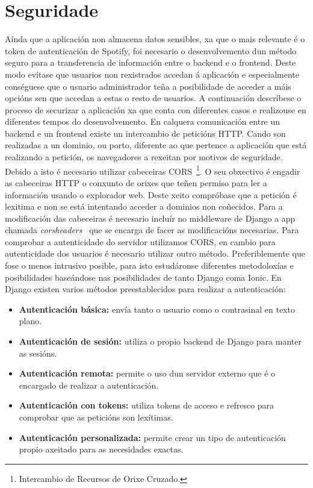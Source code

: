 \section{Seguridade}
Aínda que a aplicación non almacena datos sensibles, xa que o mais relevante é o token de autenticación de Spotify, foi necesario o desenvolvemento dun método seguro para a transferencia de información entre o backend e o frontend. Deste modo evítase que usuarios non rexistrados accedan á aplicación e especialmente conséguese que o usuario administrador teña a posibilidade de acceder a máis opcións sen que accedan a estas o resto de usuarios. A continuación descríbese o proceso de securizar a aplicación xa que conta con diferentes casos e realizouse en diferentes tempos do desenvolvemento.\smallbreak 
En calquera comunicación entre un backend e un frontend existe un intercambio de peticións \acrshort{HTTP}. Cando son realizadas a un dominio, ou porto, diferente ao que pertence a aplicación que está realizando a petición, os navegadores a rexeitan por motivos de seguridade. Debido a isto é necesario utilizar cabeceiras \acrlong{CORS}~\footnote{Intercambio de Recursos de Orixe Cruzado.}. O seu obxectivo é engadir as cabeceiras HTTP o conxunto de orixes que teñen permiso para ler a información usando o explorador web. Deste xeito compróbase que a petición é lexitima e non se está intentando acceder a dominios non coñecidos. Para a modificación das cabeceiras é necesario incluír no middleware de Django a app chamada \textit{corsheaders}~\cite{corsHeaders} que se encarga de facer as modificacións necesarias.\smallbreak
Para comprobar a autenticidade do servidor utilizamos CORS, en cambio para autenticidade dos usuarios é necesario utilizar outro método. Preferiblemente que fose o menos intrusivo posible, para isto estudáronse diferentes metodoloxías e posibilidades baseándose nas posibilidades de tanto Django coma Ionic. En Django existen varios métodos preestablecidos para realizar a autenticación:
\begin{itemize}
	\item \textbf{Autenticación básica:} envía tanto o usuario como o contrasinal en texto plano.
	\item \textbf{Autenticación de sesión:} utiliza o propio backend de Django para manter as sesións.
	\item \textbf{Autenticación remota:} permite o uso dun servidor externo que é o encargado de realizar a autenticación.
	\item \textbf{Autenticación con tokens:} utiliza tokens de acceso e refresco para comprobar que as peticións son lexítimas.
	\item \textbf{Autenticación personalizada:} permite crear un tipo de autenticación propio axeitado para as necesidades exactas.
\end{itemize}
